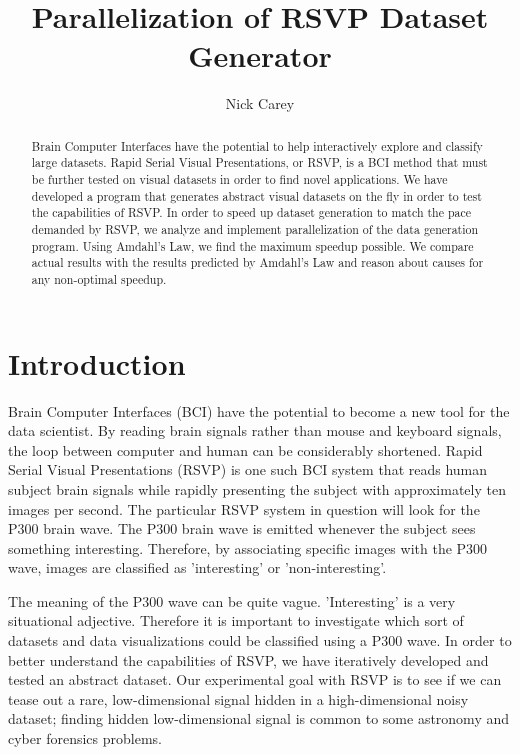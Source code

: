\documentclass[12pt, letterpaper]{article}
\title{Parallelization of RSVP Dataset Generator}
\author{Nick Carey}
\begin{document}
\maketitle

\begin{abstract}
Brain Computer Interfaces have the potential to help interactively explore and classify large datasets.
Rapid Serial Visual Presentations, or RSVP, is a BCI method that must be further tested on visual
datasets in order to find novel applications.  We have developed a program that generates abstract visual datasets
on the fly in order to test the capabilities of RSVP.  In order to speed up dataset generation to match the
pace demanded by RSVP, we analyze and implement parallelization of the data generation program.
Using Amdahl's Law, we find the maximum speedup possible.  We compare actual results with the results
predicted by Amdahl's Law and reason about causes for any non-optimal speedup.  
\end{abstract}

\section{Introduction}
Brain Computer Interfaces (BCI) have the potential to become a new tool for the data scientist. 
By reading brain signals rather than mouse and keyboard signals, the loop between computer and human
can be considerably shortened.  Rapid Serial Visual Presentations (RSVP) is one such BCI system that
reads human subject brain signals while rapidly presenting the subject with approximately ten images per second.
The particular RSVP system in question will look for the P300 brain wave.  The P300 brain wave is emitted whenever
the subject sees something interesting.  Therefore, by associating specific images with the P300 wave, images
are classified as 'interesting' or 'non-interesting'.  

The meaning of the P300 wave can be quite vague.  'Interesting' is a very situational adjective.  Therefore it is 
important to investigate which sort of datasets and data visualizations could be classified using a P300 wave.  
In order to better understand the capabilities of RSVP, we have iteratively developed and tested an abstract 
dataset.  Our experimental goal with RSVP is to see if we can tease out a rare, low-dimensional signal 
hidden in a high-dimensional noisy dataset; finding hidden low-dimensional signal is common to some astronomy and 
cyber forensics problems.  
\end{document}
